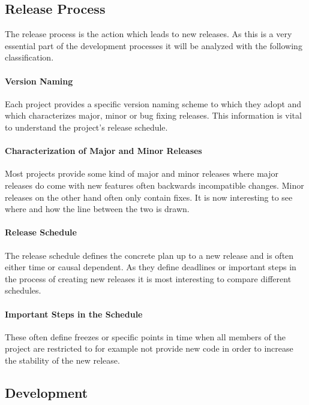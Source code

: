 \subsection{Release Process}

The release process is the action which leads to new releases. As this is a
very essential part of the development processes it will be analyzed with the
following classification.

\paragraph{Version Naming}

Each project provides a specific version naming scheme to which they adopt and
which characterizes major, minor or bug fixing releases. This information is
vital to understand the project's release schedule.

\paragraph{Characterization of Major and Minor Releases}

Most projects provide some kind of major and minor releases where major
releases do come with new features often backwards incompatible changes. Minor
releases on the other hand often only contain fixes. It is now interesting to
see where and how the line between the two is drawn.

\paragraph{Release Schedule}

The release schedule defines the concrete plan up to a new release and is often
either time or causal dependent. As they define deadlines or important steps in
the process of creating new releases it is most interesting to compare
different schedules.

\paragraph{Important Steps in the Schedule}

These often define freezes or specific points in time when all members of the
project are restricted to for example not provide new code in order to increase
the stability of the new release.

\subsection{Development}


